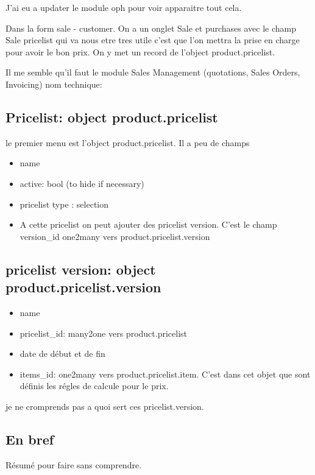 \documentclass[12pt,a4paper]{article}
\begin{document}
J'ai eu a updater le module oph pour voir apparaitre tout cela.

Dans la form sale - customer. On a un onglet Sale et purchases avec le champ  Sale pricelist  qui va nous etre tres utile c'est que l'on mettra la prise en charge pour avoir le bon prix. On y met un record de l'object product.pricelist.

Il me semble qu'il faut le module Sales Management (quotations, Sales Orders, Invoicing) nom technique: 

\subsection{Pricelist: object product.pricelist}
\label{sec:pricelist_obj}

le premier menu est l'object product.pricelist. Il  a peu de champs
\begin{itemize}
\item name
\item active: bool (to hide if necessary)
\item pricelist type : selection
\item A cette pricelist on peut ajouter des pricelist version. C'est le champ version\_id one2many vers product.pricelist.version
\end{itemize}

\subsection{pricelist version: object product.pricelist.version}
\label{sec:pricelist_version}

\begin{itemize}
\item name
\item pricelist\_id: many2one vers product.pricelist
\item date de début et de fin
\item items\_id: one2many vers product.pricelist.item. C'est dans cet objet que sont définis les régles de calcule pour le prix. 
\end{itemize}
je ne cromprends pas a quoi sert ces pricelist.version.

\subsection{En bref}
\label{sec:bref}

Résumé pour faire sans comprendre.
\end{document}
